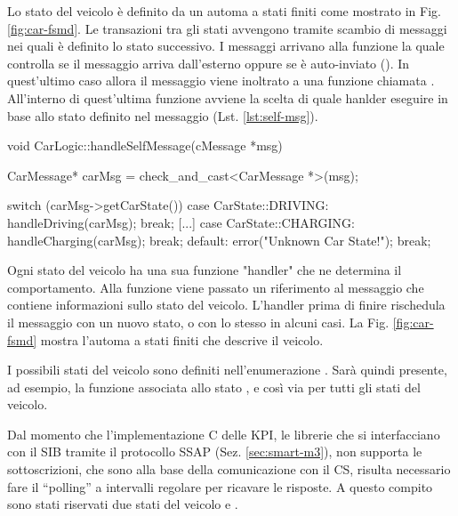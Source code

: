 Lo stato del veicolo è definito da un automa a stati finiti come mostrato in Fig. \ref{fig:car-fsmd}. Le transazioni tra gli stati avvengono tramite scambio di messaggi nei quali è definito lo stato successivo. I messaggi arrivano alla funzione  la quale controlla se il messaggio arriva dall'esterno oppure se è auto-inviato (). In quest'ultimo caso allora il messaggio viene inoltrato a una funzione chiamata . All'interno di quest'ultima funzione avviene la scelta di quale hanlder eseguire in base allo stato definito nel messaggio (Lst. \ref{lst:self-msg}).

\begin{cpp}[caption={Funzione di scelta dello stato}, label={lst:self-msg}]
void CarLogic::handleSelfMessage(cMessage *msg) {
	CarMessage* carMsg = check_and_cast<CarMessage *>(msg);
	
	switch (carMsg->getCarState()) {
		case CarState::DRIVING:
			handleDriving(carMsg);
			break;
		[...]
		case CarState::CHARGING:
			handleCharging(carMsg);
			break;
		default:
			error("Unknown Car State!");
			break;
	}	
}
\end{cpp}

Ogni stato del veicolo ha una sua funzione "handler" che ne determina il comportamento. Alla funzione viene passato un riferimento al messaggio che contiene informazioni sullo stato del veicolo. L'handler prima di finire rischedula il messaggio con un nuovo stato, o con lo stesso in alcuni casi. La Fig. \ref{fig:car-fsmd} mostra l'automa a stati finiti che descrive il veicolo. 

I possibili stati del veicolo sono definiti nell'enumerazione . Sarà quindi presente, ad esempio, la funzione  associata allo stato , e così via per tutti gli stati del veicolo.

Dal momento che l'implementazione C delle KPI, le librerie che si interfacciano con il SIB tramite il protocollo SSAP (Sez. \ref{sec:smart-m3}), non supporta le sottoscrizioni, che sono alla base della comunicazione con il CS, risulta necessario fare il ``polling'' a intervalli regolare per ricavare le risposte. A questo compito sono stati riservati due stati del veicolo  e . 

